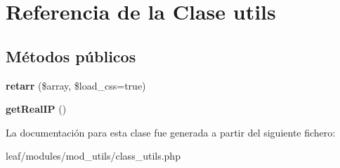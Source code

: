 \hypertarget{classutils}{\section{Referencia de la Clase utils}
\label{classutils}
}
\subsection*{Métodos públicos}
\begin{DoxyCompactItemize}
\item 
\hypertarget{classutils_a9e4884d017bce3e122ca71e650c476a5}{{\bfseries retarr} (\$array, \$load\-\_\-css=true)}\label{classutils_a9e4884d017bce3e122ca71e650c476a5}

\item 
\hypertarget{classutils_a0657599cdd55c01a672db6ca47939009}{{\bfseries get\-Real\-I\-P} ()}\label{classutils_a0657599cdd55c01a672db6ca47939009}

\end{DoxyCompactItemize}


La documentación para esta clase fue generada a partir del siguiente fichero\-:\begin{DoxyCompactItemize}
\item 
leaf/modules/mod\-\_\-utils/class\-\_\-utils.\-php\end{DoxyCompactItemize}
